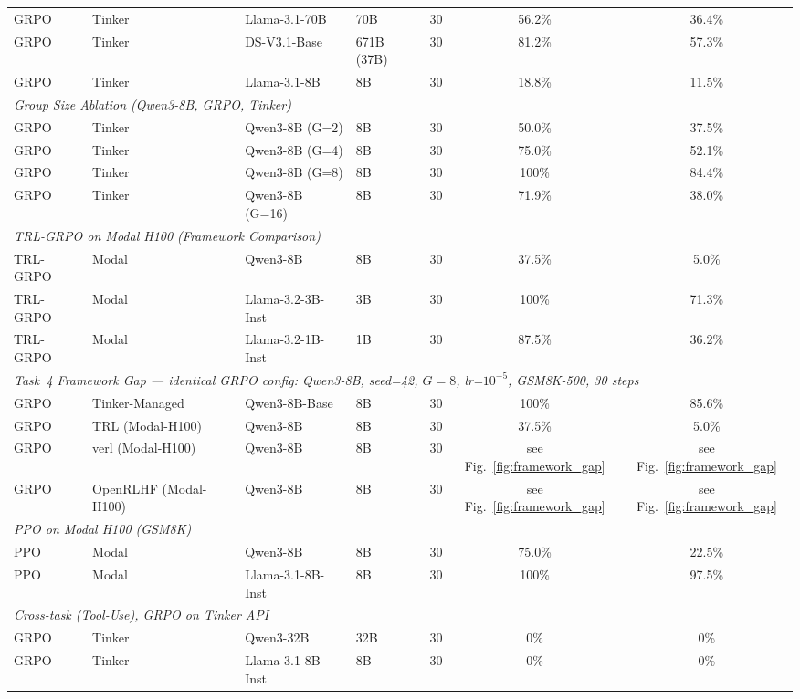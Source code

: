\documentclass{article}
\begin{document}
\begin{table}[t]
\begin{tabular}{@{}l l l l r c c@{}}
GRPO & Tinker & Llama-3.1-70B & 70B & 30 & 56.2\% & 36.4\% \\
GRPO & Tinker & DS-V3.1-Base & 671B (37B) & 30 & 81.2\% & 57.3\% \\
GRPO & Tinker & Llama-3.1-8B & 8B & 30 & 18.8\% & 11.5\% \\
\midrule
\multicolumn{7}{l}{\textit{Group Size Ablation (Qwen3-8B, GRPO, Tinker)}} \\
\midrule
GRPO & Tinker & Qwen3-8B (G=2) & 8B & 30 & 50.0\% & 37.5\% \\
GRPO & Tinker & Qwen3-8B (G=4) & 8B & 30 & 75.0\% & 52.1\% \\
GRPO & Tinker & Qwen3-8B (G=8) & 8B & 30 & 100\% & 84.4\% \\
GRPO & Tinker & Qwen3-8B (G=16) & 8B & 30 & 71.9\% & 38.0\% \\
\midrule
\multicolumn{7}{l}{\textit{TRL-GRPO on Modal H100 (Framework Comparison)}} \\
\midrule
TRL-GRPO & Modal & Qwen3-8B & 8B & 30 & 37.5\% & 5.0\% \\
TRL-GRPO & Modal & Llama-3.2-3B-Inst & 3B & 30 & 100\% & 71.3\% \\
TRL-GRPO & Modal & Llama-3.2-1B-Inst & 1B & 30 & 87.5\% & 36.2\% \\
\midrule
\multicolumn{7}{l}{\textit{Task~4 Framework Gap --- identical GRPO config: Qwen3-8B, seed=42, $G=8$, lr=$10^{-5}$, GSM8K-500, 30 steps}} \\
\midrule
GRPO & Tinker-Managed & Qwen3-8B-Base & 8B & 30 & 100\% & 85.6\% \\
GRPO & TRL (Modal-H100) & Qwen3-8B & 8B & 30 & 37.5\% & 5.0\% \\
GRPO & verl (Modal-H100) & Qwen3-8B & 8B & 30 & see Fig.~\ref{fig:framework_gap} & see Fig.~\ref{fig:framework_gap} \\
GRPO & OpenRLHF (Modal-H100) & Qwen3-8B & 8B & 30 & see Fig.~\ref{fig:framework_gap} & see Fig.~\ref{fig:framework_gap} \\
\midrule
\multicolumn{7}{l}{\textit{PPO on Modal H100 (GSM8K)}} \\
\midrule
PPO & Modal & Qwen3-8B & 8B & 30 & 75.0\% & 22.5\% \\
PPO & Modal & Llama-3.1-8B-Inst & 8B & 30 & 100\% & 97.5\% \\
\midrule
\multicolumn{7}{l}{\textit{Cross-task (Tool-Use), GRPO on Tinker API}} \\
\midrule
GRPO & Tinker & Qwen3-32B & 32B & 30 & 0\% & 0\% \\
GRPO & Tinker & Llama-3.1-8B-Inst & 8B & 30 & 0\% & 0\% \\
\bottomrule
\end{tabular}
\end{table}
\end{document}
